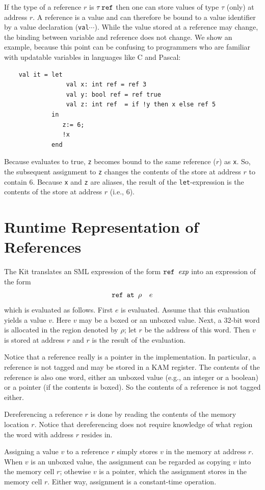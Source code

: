 \documentclass[12pt]{book}
\begin{document}
\noindent
If the type
of a reference $r$ 
is $\tau\,\hbox{\tt ref}$ then one can store values of type $\tau$ (only)
at address $r$. 
A reference is a value and can therefore be bound to a value identifier
by a value declaration ({\tt val}$\cdots$). While the
value stored at a reference may change, the binding between variable
and reference does not change. We show an example,
because this point can be confusing to programmers who are familiar with
updatable variables in languages like C and Pascal:
\begin{verbatim}
    val it = let
                 val x: int ref = ref 3
                 val y: bool ref = ref true
                 val z: int ref  = if !y then x else ref 5
             in 
                z:= 6;
                !x
             end
\end{verbatim}
Because  evaluates to true, {\tt z} becomes bound
to the same reference ($r$) as {\tt x}. 
So, the subsequent assignment to {\tt z} 
changes the contents of the store at address $r$
to contain 6. Because {\tt x} and {\tt z} are aliases, the
result of the {\tt let}-expression is the contents of the store
at address $r$ (i.e., 6).

\section{Runtime Representation of References}
The Kit translates an 
SML expression of the form $\hbox{\tt ref $\hbox{\it exp}$}$\/ into
an expression of the form
$$\hbox{\tt ref at $\rho\quad e$}$$
which is evaluated as follows. First $e$ is evaluated. Assume that 
this evaluation yields a value $v$. Here $v$ may be a boxed 
or an unboxed value.
Next, a 32-bit word is allocated in the region denoted by $\rho$;
let $r$ be the address of this word. Then $v$ is stored at
address $r$ and $r$ is the result of the evaluation.

Notice that a reference really is a pointer in the implementation. 
In particular,
a reference is not tagged and may  be stored
in a KAM register. The contents
of the reference is also one word, either an unboxed value (e.g., 
an integer or a boolean) or a pointer (if the contents is boxed). 
So the contents of a reference is not tagged either.

Dereferencing a reference $r$ 
is done by reading the contents of the memory location $r$.
Notice that dereferencing does not require knowledge of what region the word
with address $r$ resides in.

Assigning a value $v$ to a reference $r$ simply stores $v$ in the
memory at address $r$. When $v$ is an unboxed value, the assignment can be
regarded as copying $v$ into the memory cell $r$; othewise $v$ is
a pointer, which the assignment stores in the memory cell $r$. Either
way, assignment is a constant-time operation.
\end{document}
